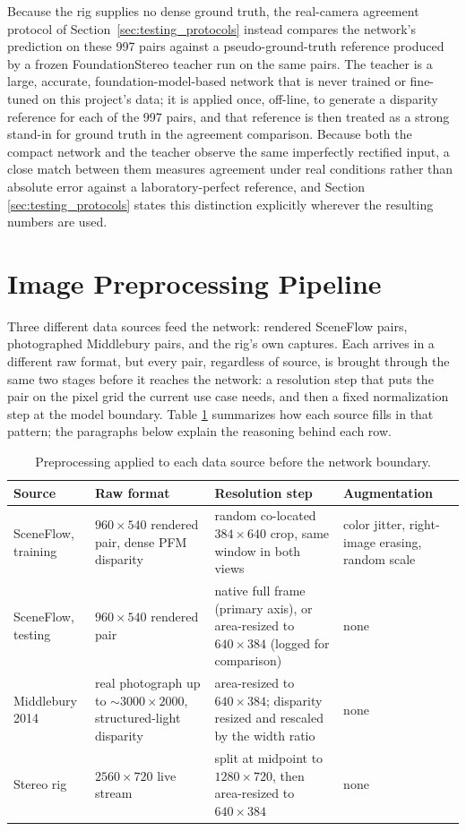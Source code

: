Because the rig supplies no dense ground truth, the real-camera
agreement protocol of Section~\ref{sec:testing_protocols} instead
compares the network's prediction on these 997 pairs against a
pseudo-ground-truth reference produced by a frozen FoundationStereo
teacher run on the same pairs. The teacher is a large, accurate,
foundation-model-based network that is never trained or fine-tuned on
this project's data; it is applied once, off-line, to generate a
disparity reference for each of the 997 pairs, and that reference is
then treated as a strong stand-in for ground truth in the agreement
comparison. Because both the compact network and the teacher observe
the same imperfectly rectified input, a close match between them
measures agreement under real conditions rather than absolute error
against a laboratory-perfect reference, and Section
\ref{sec:testing_protocols} states this distinction explicitly wherever
the resulting numbers are used.

\FloatBarrier
\section{Image Preprocessing Pipeline}
\label{sec:preprocessing}
Three different data sources feed the network: rendered SceneFlow pairs,
photographed Middlebury pairs, and the rig's own captures. Each arrives
in a different raw format, but every pair, regardless of source, is
brought through the same two stages before it reaches the network: a
resolution step that puts the pair on the pixel grid the current use
case needs, and then a fixed normalization step at the model boundary.
Table \ref{tab:preprocessing} summarizes how each source fills in that
pattern; the paragraphs below explain the reasoning behind each row.

\begin{table}[!htbp]
\centering
\caption{Preprocessing applied to each data source before the network boundary.}
\label{tab:preprocessing}
\small
\begin{tabular}{p{2.4cm}p{3.1cm}p{4.3cm}p{2.6cm}}
\toprule
Source & Raw format & Resolution step & Augmentation\\
\midrule
SceneFlow, training & $960\times540$ rendered pair, dense PFM disparity & random co-located $384\times640$ crop, same window in both views & color jitter, right-image erasing, random scale\\
SceneFlow, testing & $960\times540$ rendered pair & native full frame (primary axis), or area-resized to $640\times384$ (logged for comparison) & none\\
Middlebury 2014 & real photograph up to ${\sim}3000\times2000$, structured-light disparity & area-resized to $640\times384$; disparity resized and rescaled by the width ratio & none\\
Stereo rig & $2560\times720$ live stream & split at midpoint to $1280\times720$, then area-resized to $640\times384$ & none\\
\bottomrule
\end{tabular}
\end{table}

